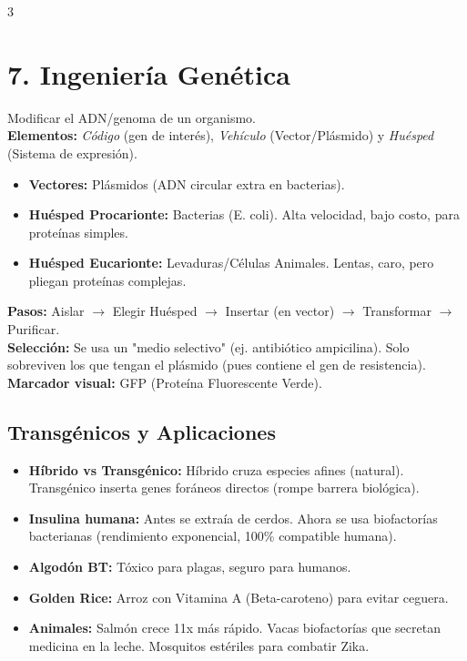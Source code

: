 \documentclass[9pt,letterpaper]{extarticle}
\begin{document}
\begin{multicols*}{3}
	\section*{7. Ingeniería Genética}
	Modificar el ADN/genoma de un organismo. \\
	\textbf{Elementos:} \textit{Código} (gen de interés), \textit{Vehículo} (Vector/Plásmido) y \textit{Huésped} (Sistema de expresión).
	\begin{itemize}
		\item \textbf{Vectores:} Plásmidos (ADN circular extra en bacterias).
		\item \textbf{Huésped Procarionte:} Bacterias (E. coli). Alta velocidad, bajo costo, para proteínas simples.
		\item \textbf{Huésped Eucarionte:} Levaduras/Células Animales. Lentas, caro, pero pliegan proteínas complejas.
	\end{itemize}
	\textbf{Pasos:} Aislar $\rightarrow$ Elegir Huésped $\rightarrow$ Insertar (en vector) $\rightarrow$ Transformar $\rightarrow$ Purificar. \\
	\textbf{Selección:} Se usa un "medio selectivo" (ej. antibiótico ampicilina). Solo sobreviven los que tengan el plásmido (pues contiene el gen de resistencia). \\
	\textbf{Marcador visual:} GFP (Proteína Fluorescente Verde).
	
	\subsection*{Transgénicos y Aplicaciones}
	\begin{itemize}
		\item \textbf{Híbrido vs Transgénico:} Híbrido cruza especies afines (natural). Transgénico inserta genes foráneos directos (rompe barrera biológica).
		\item \textbf{Insulina humana:} Antes se extraía de cerdos. Ahora se usa biofactorías bacterianas (rendimiento exponencial, 100\% compatible humana).
		\item \textbf{Algodón BT:} Tóxico para plagas, seguro para humanos.
		\item \textbf{Golden Rice:} Arroz con Vitamina A (Beta-caroteno) para evitar ceguera.
		\item \textbf{Animales:} Salmón crece 11x más rápido. Vacas biofactorías que secretan medicina en la leche. Mosquitos estériles para combatir Zika.
	\end{itemize}


\end{multicols*}
\end{document}
